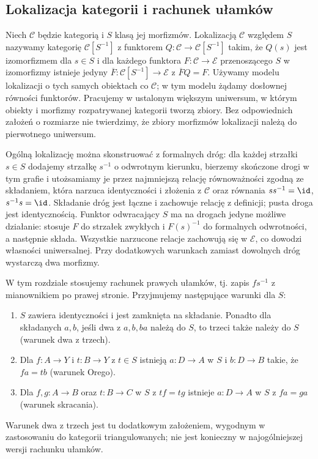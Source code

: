 \subsection{Lokalizacja kategorii i rachunek ułamków}
\begin{definicja}\label{cat:def:categorical-localization}
Niech $\mathcal C$ będzie kategorią i $S$ klasą jej morfizmów. Lokalizacją $\mathcal C$ względem $S$ nazywamy kategorię $\mathcal C[S^{-1}]$ z funktorem $Q:\mathcal C\to\mathcal C[S^{-1}]$ takim, że $Q(s)$ jest izomorfizmem dla $s\in S$ i dla każdego funktora $F:\mathcal C\to\mathcal E$ przenoszącego $S$ w izomorfizmy istnieje jedyny $\overline F:\mathcal C[S^{-1}]\to\mathcal E$ z $\overline FQ=F$. Używamy modelu lokalizacji o tych samych obiektach co $\mathcal C$; w tym modelu żądamy dosłownej równości funktorów. Pracujemy w ustalonym większym uniwersum, w którym obiekty i morfizmy rozpatrywanej kategorii tworzą zbiory. Bez odpowiednich założeń o rozmiarze nie twierdzimy, że zbiory morfizmów lokalizacji należą do pierwotnego uniwersum.
\end{definicja}
\begin{uwaga}
Ogólną lokalizację można skonstruować z formalnych dróg: dla każdej strzałki $s\in S$ dodajemy strzałkę $s^{-1}$ o odwrotnym kierunku, bierzemy skończone drogi w tym grafie i utożsamiamy je przez najmniejszą relację równoważności zgodną ze składaniem, która narzuca identyczności i złożenia z $\mathcal C$ oraz równania $ss^{-1}=\id$, $s^{-1}s=\id$. Składanie dróg jest łączne i zachowuje relację z definicji; pusta droga jest identycznością. Funktor odwracający $S$ ma na drogach jedyne możliwe działanie: stosuje $F$ do strzałek zwykłych i $F(s)^{-1}$ do formalnych odwrotności, a następnie składa. Wszystkie narzucone relacje zachowują się w $\mathcal E$, co dowodzi własności uniwersalnej. Przy dodatkowych warunkach zamiast dowolnych dróg wystarczą dwa morfizmy.
\end{uwaga}
\begin{definicja}\label{cat:def:right-fractions}
W tym rozdziale stosujemy rachunek prawych ułamków, tj. zapis $fs^{-1}$ z mianownikiem po prawej stronie. Przyjmujemy następujące warunki dla $S$:
\begin{enumerate}[label=\textup{(RF\arabic*)}]
 \item $S$ zawiera identyczności i jest zamknięta na składanie. Ponadto dla składanych $a,b$, jeśli dwa z $a,b,ba$ należą do $S$, to trzeci także należy do $S$ (warunek dwa z trzech).
 \item Dla $f:A\to Y$ i $t:B\to Y$ z $t\in S$ istnieją $a:D\to A$ w $S$ i $b:D\to B$ takie, że $fa=tb$ (warunek Orego).
 \item Dla $f,g:A\to B$ oraz $t:B\to C$ w $S$ z $tf=tg$ istnieje $a:D\to A$ w $S$ z $fa=ga$ (warunek skracania).
\end{enumerate}
Warunek dwa z trzech jest tu dodatkowym założeniem, wygodnym w zastosowaniu do kategorii triangulowanych; nie jest konieczny w najogólniejszej wersji rachunku ułamków.
\end{definicja}
